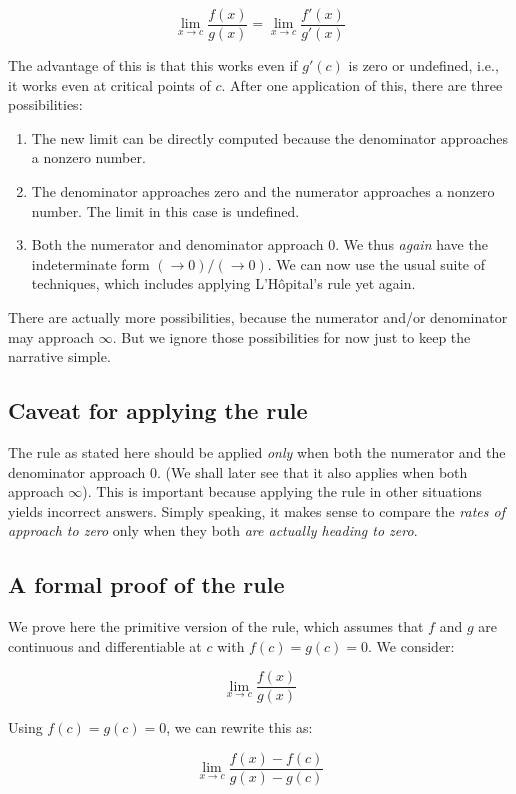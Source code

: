 \documentclass{amsart}
\begin{document}
$$\lim_{x \to c} \frac{f(x)}{g(x)} = \lim_{x \to c}\frac{f'(x)}{g'(x)}$$

The advantage of this is that this works even if $g'(c)$ is zero or
undefined, i.e., it works even at critical points of $c$. After one
application of this, there are three possibilities:

\begin{enumerate}
\item The new limit can be directly computed because the denominator
  approaches a nonzero number.
\item The denominator approaches zero and the numerator approaches a
  nonzero number. The limit in this case is undefined.
\item Both the numerator and denominator approach $0$. We thus {\em
  again} have the indeterminate form $(\to 0)/(\to 0)$. We can now use
  the usual suite of techniques, which includes applying
  L'H\^{o}pital's rule yet again.
\end{enumerate}

There are actually more possibilities, because the numerator and/or
denominator may approach $\infty$. But we ignore those possibilities
for now just to keep the narrative simple.
\subsection{Caveat for applying the rule}

The rule as stated here should be applied {\em only} when both the
numerator and the denominator approach $0$. (We shall later see that
it also applies when both approach $\infty$). This is important
because applying the rule in other situations yields incorrect
answers. Simply speaking, it makes sense to compare the {\em rates of
approach to zero} only when they both {\em are actually heading to
zero}.

\subsection{A formal proof of the rule}

We prove here the primitive version of the rule, which assumes that
$f$ and $g$ are continuous and differentiable at $c$ with $f(c) = g(c)
= 0$. We consider:

$$\lim_{x \to c} \frac{f(x)}{g(x)}$$

Using $f(c) = g(c) = 0$, we can rewrite this as:

$$\lim_{x \to c} \frac{f(x) - f(c)}{g(x) - g(c)}$$
\end{document}
